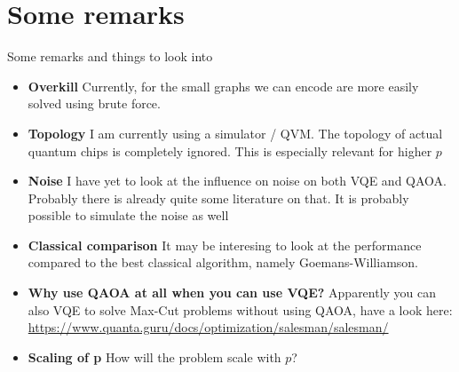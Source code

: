 \documentclass{beamer}
\begin{document}
\section{Some remarks}
\begin{frame}{Some remarks and things to look into}
\begin{itemize}
\item \textbf{Overkill}
Currently, for the small graphs we can encode are more easily solved using brute force.

\item \textbf{Topology}
I am currently using a simulator / QVM. The topology of actual quantum chips is completely ignored. This is especially relevant for higher $p$

\item \textbf{Noise}
I have yet to look at the influence on noise on both VQE and QAOA. Probably there is already quite some literature on that. It is probably possible to simulate the noise as well

\item \textbf{Classical comparison}
It may be interesing to look at the performance compared to the best classical algorithm, namely Goemans-Williamson. 

\item \textbf{Why use QAOA at all when you can use VQE?}
Apparently you can also VQE to solve Max-Cut problems without using QAOA, have a look here: \url{https://www.quanta.guru/docs/optimization/salesman/salesman/ }

\item \textbf{Scaling of p} How will the problem scale with $p$?
\end{itemize}

\end{frame}
\end{document}
